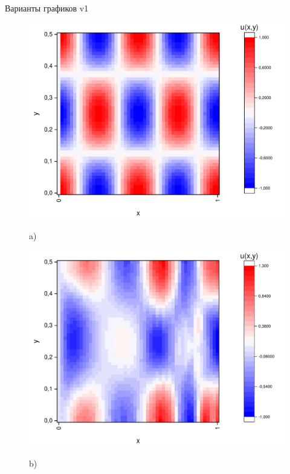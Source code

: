 \documentclass[a4paper,12pt]{article}
\begin{document}
Варианты графиков v1
\begin{figure}[h!]
	\begin{center}
		\begin{minipage}[h]{0.23\linewidth}
			\includegraphics[width=\textwidth]{graphs/graphs_a/v1/wave_t-0_v1.pdf} \begin{center}	a)	\end{center}
		\end{minipage}
		\begin{minipage}[h]{0.23\linewidth}
			\includegraphics[width=\textwidth]{graphs/graphs_a/v1/wave_t-6_v1.pdf} \begin{center}	b)	\end{center}

\end{minipage}
\end{center}
\end{figure}
\end{document}
